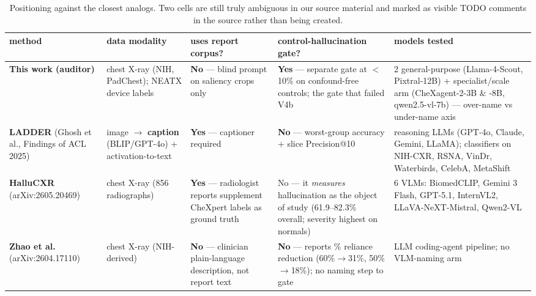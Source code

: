 \documentclass{ieeeaccess}
\begin{document}
\begin{table}[!t]
\caption{Positioning against the closest analogs. Two cells are still truly ambiguous in our source material and marked as visible TODO comments in the source rather than being created.}
\label{tab:positioning}
\centering
\footnotesize
\renewcommand{\arraystretch}{1.3}
\begin{tabular}{p{2.3cm} p{2.6cm} p{2.3cm} p{3.0cm} p{3.4cm}}
\toprule
\textbf{method} & \textbf{data modality} & \textbf{uses report corpus?} & \textbf{control-hallucination gate?} & \textbf{models tested} \\
\midrule
\textbf{This work (auditor)} & chest X-ray (NIH, PadChest); NEATX device labels & \textbf{No} --- blind prompt on saliency crops only & \textbf{Yes} --- separate gate at $<$10\% on confound-free controls; the gate that failed V4b & 2 general-purpose (Llama-4-Scout, Pixtral-12B) + specialist/scale arm (CheXagent-2-3B \& -8B, qwen2.5-vl-7b) --- over-name vs under-name axis \\
\textbf{LADDER} (Ghosh et al., Findings of ACL 2025) & image $\rightarrow$ \textbf{caption} (BLIP/GPT-4o) + activation-to-text & \textbf{Yes} --- captioner required & \textbf{No} --- worst-group accuracy + slice Precision@10 & reasoning LLMs (GPT-4o, Claude, Gemini, LLaMA); classifiers on NIH-CXR, RSNA, VinDr, Waterbirds, CelebA, MetaShift \\
\textbf{HalluCXR} (arXiv:2605.20469) & chest X-ray (856 radiographs) & \textbf{Yes} --- radiologist reports supplement CheXpert labels as ground truth & No --- it \emph{measures} hallucination as the object of study (61.9--82.3\% overall; severity highest on normals) & 6 VLMs: BiomedCLIP, Gemini 3 Flash, GPT-5.1, InternVL2, LLaVA-NeXT-Mistral, Qwen2-VL \\
\textbf{Zhao et al.} (arXiv:2604.17110) & chest X-ray (NIH-derived) & \textbf{No} --- clinician plain-language description, not report text & \textbf{No} --- reports \% reliance reduction (60\%$\rightarrow$31\%, 50\%$\rightarrow$18\%); no naming step to gate & LLM coding-agent pipeline; no VLM-naming arm \\
\bottomrule
\end{tabular}
\end{table}

\end{document}
